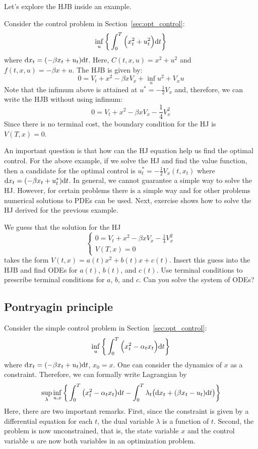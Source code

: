 \documentclass[11pt]{book}
\newcommand{\dt}{\text{\normalfont d}t}
\newcommand{\dx}{\text{\normalfont d}x}
\begin{document}
Let's explore the HJB inside an example.
\begin{eg}
    Consider the control problem in Section~\ref{sec:opt_control}:
\begin{equation}
\inf_{u}\bigg\{\int_0^T\Big(x_t^2 +u_t^2\Big) {{\dt}}\bigg\}
\end{equation}
where ${\dx}_t = (-\beta x_t + u_t ){{\dt}}$.
Here, $C(t,x,u)=x^2 + u^2$ and $f(t,x,u)=-\beta x + u$.
The HJB is given by:
\[
0 = V_t + x^2 -\beta x V_x + \inf_{u} u^2 + V_x u
\]
Note that the infimum above is attained at $u^*=-\frac12V_x$ and, therefore, we can write the HJB without using infimum:
\[
0 = V_t + x^2 -\beta x V_x -\frac14 V_x^2 
\]
Since there is no terminal cost, the boundary condition for the HJ is $V(T,x)=0$. 
\end{eg}
An important question is that how can the HJ equation help us find the optimal control. For the above example, if we solve the HJ and find the value function, then a candidate for the optimal control is $u_t^*=-\frac12V_x(t,x_t)$ where ${\dx}_t = (-\beta x_t + u_t^* ){{\dt}}$. In general, we cannot guarantee a simple way to solve the HJ. However, for certain problems there is a simple way and for other problems numerical solutions to PDEs can be used. Next, exercise shows how to solve the HJ derived for the previous example.
\begin{ex}
    We guess that the solution for the HJ
    \[
    \begin{cases}
    0 = V_t + x^2 -\beta x V_x -\frac14 V_x^2 \\
    V(T,x)=0
    \end{cases}
    \]
    takes the form $V(t,x)=a(t)x^2+b(t)x+c(t)$. Insert this guess into the HJB and find ODEs for $a(t)$, $b(t)$, and $c(t)$. Use terminal conditions to prescribe terminal conditions for $a$, $b$, and $c$. Can you solve the system of ODEs?
\end{ex}


\subsection{Pontryagin principle}
\label{sec:det_pontryagin}
Consider the simple control problem in Section~\ref{sec:opt_control}:
\begin{equation}
\inf_{u}\bigg\{\int_0^T\Big(x_t^2 - \alpha_t x_t\Big) {{\dt}}\bigg\}
\end{equation}
where ${\dx}_t = (-\beta x_t + u_t ){{\dt}}$, $x_0=x$.
One can consider the dynamics of $x$ as a constraint. Therefore, we can formally write Lagrangian by 
\begin{equation}\label{ex:sup_inf}
    \sup_{\lambda}\inf_{u,x}\bigg\{\int_0^T\big(x_t^2 - \alpha_t x_t\big) {{\dt}} - \int_0^T \lambda_t \big({\dx}_t + (\beta x_t  - u_t ){{\dt}}\big)\bigg\}
\end{equation}
Here, there are two important remarks. First,
 since the constraint is given by a differential equation for each $t$, the dual variable $\lambda$ is a function of $t$. Second, the problem is now unconstrained, that is, the state variable $x$ and the control variable $u$ are now both  variables in an optimization problem.
 
\end{document}
